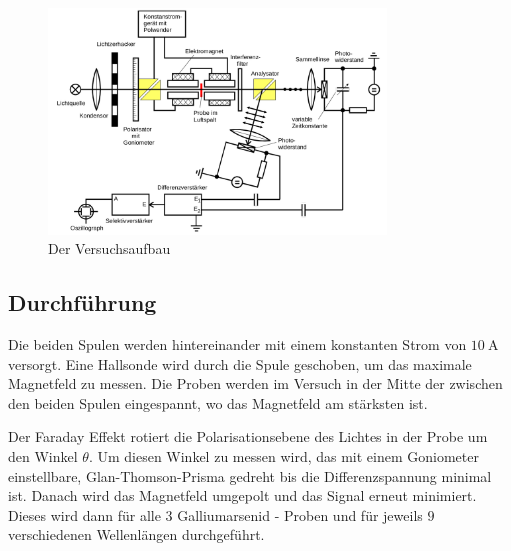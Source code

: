 \begin{figure}
	\centering
	\includegraphics[width=0.8\textwidth]{./Bilder/aufbau.png}
	\caption{Der Versuchsaufbau \cite{man}}\label{fig:aufbau}
\end{figure}

\subsection{Durchführung}
Die beiden Spulen werden hintereinander mit einem konstanten Strom von
$\qty{10}{\ampere}$ versorgt. Eine Hallsonde wird durch die Spule geschoben, um
das maximale Magnetfeld zu messen. Die Proben werden im Versuch in der Mitte
der zwischen den beiden Spulen eingespannt, wo das Magnetfeld am stärksten ist.

Der Faraday Effekt rotiert die Polarisationsebene des Lichtes in der Probe um
den Winkel $\theta$. Um diesen Winkel zu messen wird, das mit einem Goniometer
einstellbare, Glan-Thomson-Prisma gedreht bis die Differenzspannung minimal
ist. Danach wird das Magnetfeld umgepolt und das Signal erneut minimiert.
Dieses wird dann für alle $3$  Galliumarsenid - Proben und für jeweils $9$
verschiedenen Wellenlängen durchgeführt.

\newpage